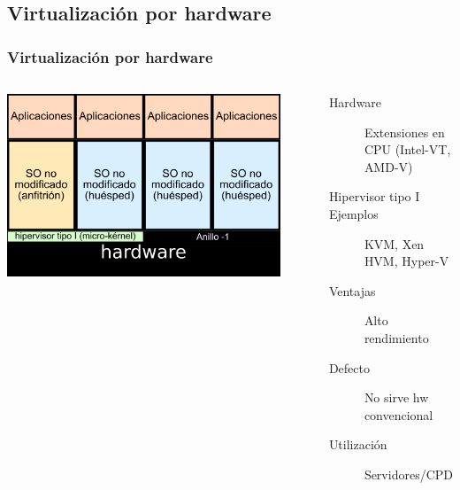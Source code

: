 \documentclass{beamer}
\begin{document}
\subsection{Virtualización por hardware}
\begin{frame} \frametitle{Virtualización por hardware}
  \begin{columns}
    \begin{center}
    \includegraphics[width=0.9\textwidth]{img/virt_hw.png}      
    \end{center}
    \begin{description}
    \item[Hardware] Extensiones en CPU (Intel-VT, AMD-V)
    \item[Hipervisor tipo I]
    \item[Ejemplos] KVM, Xen HVM, Hyper-V
    \item [Ventajas] Alto rendimiento
    \item[Defecto] No sirve hw convencional
    \item[Utilización] Servidores/CPD
    \end{description}
  \end{columns}
\end{frame}
\end{document}
